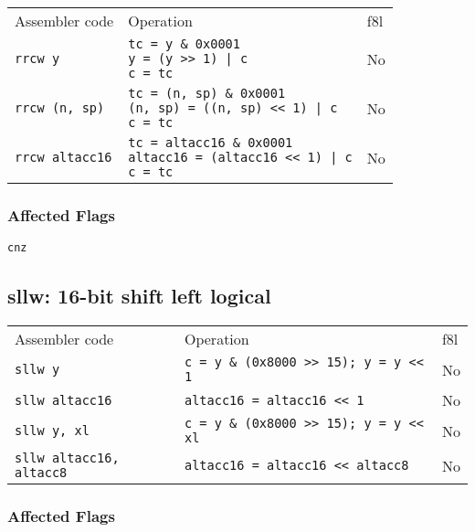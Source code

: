\documentclass{book}
\begin{document}
\begin{tabular}{l l l}
Assembler code         & Operation                                                                                                   & f8l \\
\texttt{rrcw y}        & \makecell{\texttt{tc = y \& 0x0001}\\\texttt{y = (y >> 1) | c}\\\texttt{c = tc}}                    & No \\
\texttt{rrcw (n, sp)}  & \makecell{\texttt{tc = (n, sp) \& 0x0001}\\\texttt{(n, sp) = ((n, sp) << 1) | c}\\\texttt{c = tc}}  & No \\
\texttt{rrcw altacc16} & \makecell{\texttt{tc = altacc16 \& 0x0001}\\\texttt{altacc16 = (altacc16 << 1) | c}\\\texttt{c = tc}} & No
\end{tabular}

\subsubsection*{Affected Flags}

\texttt{cnz}


\subsection{sllw: 16-bit shift left logical}

\begin{tabular}{l l l}
Assembler code                  & Operation                                     & f8l \\
\texttt{sllw y}                 & \texttt{c = y \& (0x8000 >> 15); y = y << 1}  & No \\
\texttt{sllw altacc16}          & \texttt{altacc16 = altacc16 << 1}             & No \\
\texttt{sllw y, xl}             & \texttt{c = y \& (0x8000 >> 15); y = y << xl} & No \\
\texttt{sllw altacc16, altacc8} & \texttt{altacc16 = altacc16 << altacc8}       & No \\
\end{tabular}

\subsubsection*{Affected Flags}
\end{document}
